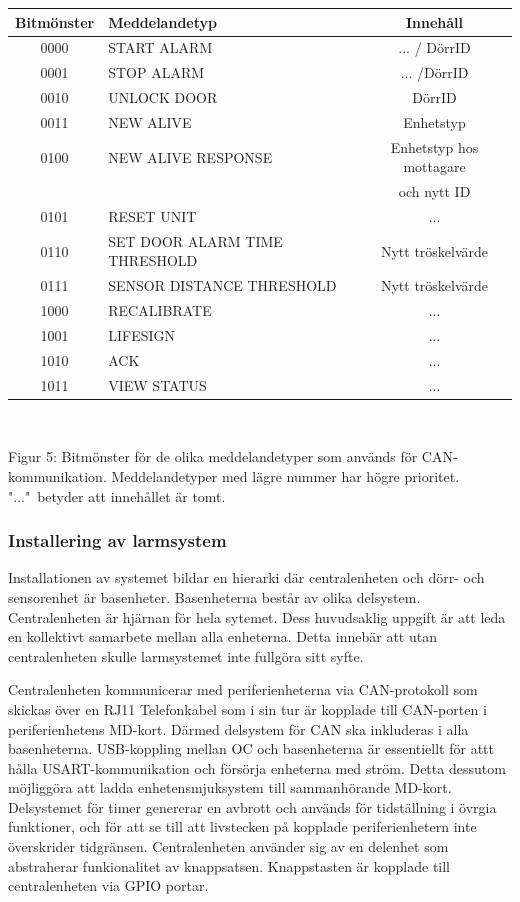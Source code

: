 \documentclass{article}
\begin{document}
\begin{tabular}{|c|l|c|}
    \hline
    Bitmönster & Meddelandetyp & Innehåll \\
    \hline
    0000 & START ALARM & ... / DörrID \\
    0001 & STOP ALARM & ... /DörrID \\
    0010 & UNLOCK DOOR & DörrID \\
    0011 & NEW ALIVE & Enhetstyp \\
    0100 & NEW ALIVE RESPONSE & Enhetstyp hos mottagare \\ 
    &&och nytt ID \\
    0101 & RESET UNIT & ... \\
    0110 & SET DOOR ALARM TIME THRESHOLD & Nytt tröskelvärde \\
    0111 & SENSOR DISTANCE THRESHOLD & Nytt tröskelvärde \\
    1000 & RECALIBRATE & ... \\
    1001 & LIFESIGN & ... \\
    1010 & ACK & ... \\
    1011 & VIEW STATUS & ... \\
    \hline
\end{tabular}
\\
\begin{center}
\caption{Figur 5: Bitmönster för de olika meddelandetyper som används för CAN-kommunikation. Meddelandetyper med lägre nummer har högre prioritet. "..."\ betyder att innehållet är tomt.}
\end{center}

\subsubsection{Installering av larmsystem}
Installationen av systemet bildar en hierarki där centralenheten och dörr- och sensorenhet är basenheter. Basenheterna består av olika delsystem. Centralenheten är hjärnan för hela sytemet. Dess huvudsaklig uppgift är att leda en kollektivt samarbete mellan alla enheterna. Detta innebär att utan centralenheten skulle larmsystemet inte fullgöra sitt syfte. 

\noindent Centralenheten kommunicerar med periferienheterna via CAN-protokoll som skickas över en RJ11 Telefonkabel som i sin tur är kopplade till CAN-porten i periferienhetens MD-kort. Därmed delsystem för CAN ska inkluderas i alla basenheterna. USB-koppling mellan OC och basenheterna är essentiellt för attt hålla USART-kommunikation och försörja enheterna med ström. Detta dessutom möjliggöra att ladda enhetensmjuksystem till sammanhörande MD-kort. Delsystemet för timer genererar en avbrott och används för tidställning i övrgia funktioner, och för att se till att livstecken på kopplade periferienhetern inte överskrider tidgränsen. Centralenheten använder sig av en delenhet som abstraherar funkionalitet av knappsatsen. Knappstasten är kopplade till centralenheten via GPIO portar.
\end{document}
